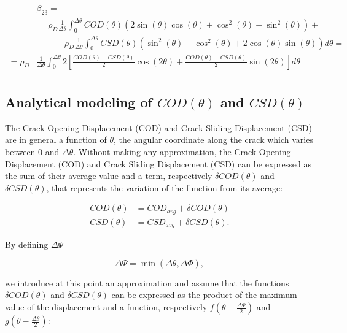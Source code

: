 \documentclass[review]{elsarticle}
\begin{document}
\begin{equation}
\begin{aligned}
&\beta_{23}=\\
&=\rho_{D}\frac{1}{\Delta\theta}\int_{0}^{\Delta\theta}COD\left(\theta\right)\left(2\sin{\left(\theta\right)}\cos{\left(\theta\right)}+\cos^{2}{\left(\theta\right)}-\sin^{2}\left(\theta\right)\right)+\\
&\qquad-\rho_{D}\frac{1}{\Delta\theta}\int_{0}^{\Delta\theta}CSD\left(\theta\right)\left(\sin^{2}{\left(\theta\right)}-\cos^{2}{\left(\theta\right)}+2\cos{\left(\theta\right)}\sin{\left(\theta\right)}\right)d\theta=\\
=\rho_{D}&\frac{1}{\Delta\theta}\int_{0}^{\Delta\theta}2\left[\frac{COD\left(\theta\right)+CSD\left(\theta\right)}{2}\cos\left(2\theta\right)+\frac{COD\left(\theta\right)-CSD\left(\theta\right)}{2}\sin\left(2\theta\right)\right]d\theta\\
\end{aligned}
\end{equation}

\subsection{Analytical modeling of $COD\left(\theta\right)$ and $CSD\left(\theta\right)$}

The Crack Opening Displacement (COD) and Crack Sliding Displacement (CSD) are in general a function of $\theta$, the angular coordinate along the crack which varies between $0$ and $\Delta\theta$. Without making any approximation, the Crack Opening Displacement (COD) and Crack Sliding Displacement (CSD) can be expressed as the sum of their average value and a term, respectively $\delta COD\left(\theta\right)$ and $\delta CSD\left(\theta\right)$, that represents the variation of the function from its average:

\begin{equation}
\begin{aligned}
COD\left(\theta\right)&=COD_{avg}+\delta COD\left(\theta\right)\\
CSD\left(\theta\right)&=CSD_{avg}+\delta CSD\left(\theta\right).
\end{aligned}
\end{equation}

By defining $\Delta\Psi$

\begin{equation}
\Delta\Psi=\min\left(\Delta\theta,\Delta\Phi\right),
\end{equation}

we introduce at this point an approximation and assume that the functions $\delta COD\left(\theta\right)$ and $\delta CSD\left(\theta\right)$ can be expressed as the product of the maximum value of the displacement and a function, respectively $f\left(\theta-\frac{\Delta\Psi}{2}\right)$ and $g\left(\theta-\frac{\Delta\theta}{2}\right)$:
\end{document}
